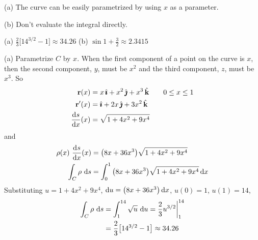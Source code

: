 \begin{hint}
(a) 
The curve can be easily parametrized by using $x$ as a parameter.

(b) 
Don't evaluate the integral directly.

\end{hint}

\begin{answer}
(a) $\frac{2}{3}\big[14^{3/2}-1\big]\approx 34.26$\qquad
(b) $\sin 1+\frac{3}{2} \approx 2.3415$
\end{answer}

\begin{solution}
(a) 
 Parametrize $C$ by $x$. When the first component of a point on the 
curve is $x$, then the second component, $y$, must be $x^2$ and 
the third component, $z$, must be $x^3$. So
\begin{align*}
\vr(x)&=x\,\hi+x^2\,\hj+x^3\,\hk\qquad 0\le x\le 1\\
\vr'(x)&=\hi+2x\,\hj+3x^2\,\hk\\
\diff{s}{x}(x)&=\sqrt{1+4x^2+9x^4}
\end{align*}
and
\begin{align*}
\rho(x)\ \diff{s}{x}(x)
&=\big(8x+36x^3\big)\sqrt{1+4x^2+9x^4}\\
\int_C\rho\ \dee{s}
&=\int_0^1 \big(8x+36x^3\big)\sqrt{1+4x^2+9x^4}\,\dee{x} 
\end{align*}
Substituting $u=1+4x^2+9x^4$, $\mathrm{d}u = \big(8x+36x^3\big)\,\mathrm{d}x$,
$u(0)=1$, $u(1)=14$,
\begin{align*}
\int_C\rho\ \mathrm{d}s
&=\int_1^{14} \sqrt{u}\ \mathrm{d}u
=\frac{2}{3}u^{3/2}\bigg|_1^{14}\\
&=\frac{2}{3}\big[14^{3/2}-1\big]\approx 34.26
\end{align*}


\end{solution}
